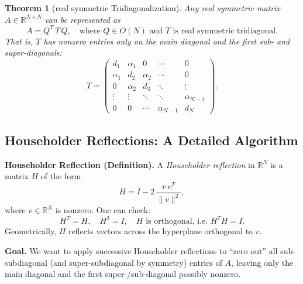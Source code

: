 \documentclass[letterpaper,11pt,oneside,reqno]{article}
\numberwithin{equation}{section}
\newtheorem{theorem}[proposition]{Theorem}
\theoremstyle{definition}
\begin{document}
\begin{theorem}[real symmetric Tridiagonalization]
\label{thm:tridiagonal}
Any real symmetric matrix \(A\in\mathbb{R}^{N\times N}\) can be represented as
\[
  A = Q^T\, T\, Q,
  \quad
  \text{where } Q\in O(N)
  \text{ and } T\text{ is real symmetric tridiagonal.}
\]
That is, \(T\) has nonzero entries only on the main diagonal and the first sub- and super-diagonals:
\[
  T = \begin{pmatrix}
         d_1 & \alpha_1 & 0 & \cdots & 0\\
         \alpha_1 & d_2 & \alpha_2 & \cdots & 0\\
         0 & \alpha_2 & d_3 & \ddots & \vdots\\
         \vdots & \vdots & \ddots & \ddots & \alpha_{N-1}\\
         0 & 0 & \cdots & \alpha_{N-1} & d_N
       \end{pmatrix}.
\]
\end{theorem}

\subsection{Householder Reflections: A Detailed Algorithm}

\noindent
\textbf{Householder Reflection (Definition).}
A \emph{Householder reflection} in \(\mathbb{R}^N\) is a matrix \(H\) of the form
\[
  H = I - 2\,\frac{v\,v^T}{\|v\|^2},
\]
where \(v\in\mathbb{R}^N\) is nonzero. One can check:
\[
  H^T = H,\quad
  H^2 = I,\quad
  H\text{ is orthogonal, i.e.\ }H^T H = I.
\]
Geometrically, \(H\) reflects vectors across the hyperplane orthogonal to \(v\).

\medskip
\noindent
\textbf{Goal.}
We want to apply successive Householder reflections to “zero out” all sub-subdiagonal (and super-subdiagonal by symmetry) entries of \(A\), leaving only the main diagonal and the first super-/sub-diagonal possibly nonzero.
\end{document}
